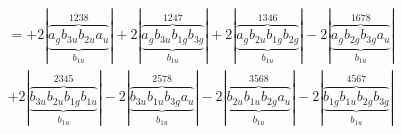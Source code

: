 \documentclass{article}
\begin{document}
\begin{multline*}
=+2\left|\underbrace{\overbrace{a_{g} b_{3u} b_{2u} a_{u}}^{1 2 3 8}}_{b_{1u}}\right|+2\left|\underbrace{\overbrace{a_{g} b_{3u} b_{1g} b_{3g}}^{1 2 4 7}}_{b_{1u}}\right|+2\left|\underbrace{\overbrace{a_{g} b_{2u} b_{1g} b_{2g}}^{1 3 4 6}}_{b_{1u}}\right|-2\left|\underbrace{\overbrace{a_{g} b_{2g} b_{3g} a_{u}}^{1 6 7 8}}_{b_{1u}}\right|\\
+2\left|\underbrace{\overbrace{b_{3u} b_{2u} b_{1g} b_{1u}}^{2 3 4 5}}_{b_{1u}}\right|-2\left|\underbrace{\overbrace{b_{3u} b_{1u} b_{3g} a_{u}}^{2 5 7 8}}_{b_{1u}}\right|-2\left|\underbrace{\overbrace{b_{2u} b_{1u} b_{2g} a_{u}}^{3 5 6 8}}_{b_{1u}}\right|-2\left|\underbrace{\overbrace{b_{1g} b_{1u} b_{2g} b_{3g}}^{4 5 6 7}}_{b_{1u}}\right|
\end{multline*}
\\\\
\end{document}
